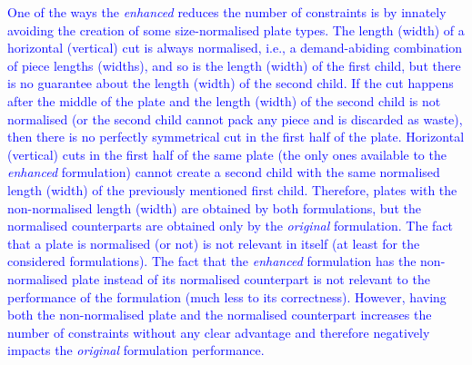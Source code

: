 \documentclass[ppgc,tese,english,formais,babel]{iiufrgs}
\newif\iffinalversion
\newcommand{\newtext}[1]{\iffinalversion%
#1%
\else%
\textcolor{blue}{#1}%
\fi%
}
\begin{document}
\newtext{
One of the ways the \emph{enhanced} reduces the number of constraints is by innately avoiding the creation of some size-normalised plate types.
The length (width) of a horizontal (vertical) cut is always normalised, i.e., a demand-abiding combination of piece lengths (widths), and so is the length (width) of the first child, but there is no guarantee about the length (width) of the second child.
If the cut happens after the middle of the plate and the length (width) of the second child is not normalised (or the second child cannot pack any piece and is discarded as waste), then there is no perfectly symmetrical cut in the first half of the plate.
Horizontal (vertical) cuts in the first half of the same plate (the only ones available to the \emph{enhanced} formulation) cannot create a second child with the same normalised length (width) of the previously mentioned first child.
Therefore, plates with the non-normalised length (width) are obtained by both formulations, but the normalised counterparts are obtained only by the \emph{original} formulation.
The fact that a plate is normalised (or not) is not relevant in itself (at least for the considered formulations).
The fact that the \emph{enhanced} formulation has the non-normalised plate instead of its normalised counterpart is not relevant to the performance of the formulation (much less to its correctness).
However, having both the non-normalised plate and the normalised counterpart increases the number of constraints without any clear advantage and therefore negatively impacts the \emph{original} formulation performance.
}
\end{document}
